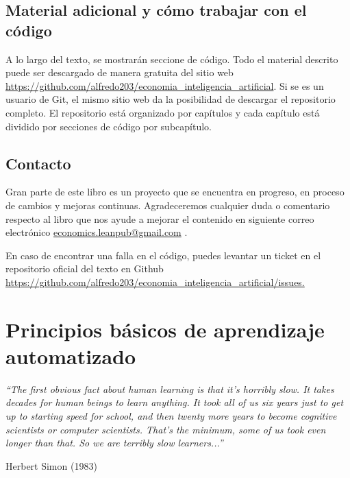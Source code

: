 \documentclass[letterpaper,12pt, spanish, oneside]{book} %
\begin{document}
\section{Material adicional y cómo trabajar con el código}

A lo largo del texto, se mostrarán seccione de código. Todo el material descrito puede ser descargado de manera gratuita del sitio web \url{https://github.com/alfredo203/economia_inteligencia_artificial}. Si se es un usuario de Git, el mismo sitio web da la posibilidad de descargar el repositorio completo. El repositorio está organizado por capítulos y cada capítulo está dividido por secciones de código por subcapítulo. 

\section{Contacto}

Gran parte de este libro es un proyecto que se encuentra en progreso, en proceso de cambios y mejoras continuas. Agradeceremos cualquier duda o comentario respecto al libro que nos ayude a mejorar el contenido en siguiente correo electrónico \href{mailto:me@somewhere.com}{economics.leanpub@gmail.com} .

En caso de encontrar una falla en el código, puedes levantar un ticket en el repositorio oficial del texto en Github \url{https://github.com/alfredo203/economia_inteligencia_artificial/issues.}

\chapter{Principios básicos de aprendizaje automatizado}
\begin{flushright}
\textit{“The first obvious fact about human learning is that it’s horribly slow. It takes decades for human beings to learn anything. It took all of us six years just to get up to starting speed for school, and then twenty more years to become cognitive scientists or computer scientists. That’s the minimum, some of us took even longer than that. So we are terribly slow learners...”}

Herbert Simon (1983)
\end{flushright}
\end{document}
